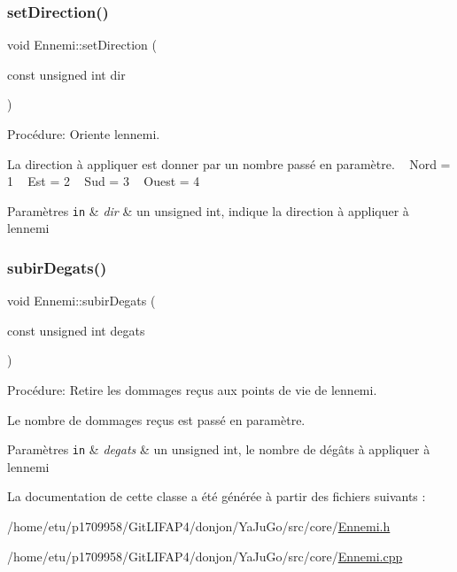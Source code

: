 \subsubsection{\texorpdfstring{set\+Direction()}{setDirection()}}
{\footnotesize\ttfamily void Ennemi\+::set\+Direction (\begin{DoxyParamCaption}\item[{const unsigned int}]{dir }\end{DoxyParamCaption})}



Procédure\+: Oriente l\textquotesingle{}ennemi. 

La direction à appliquer est donner par un nombre passé en paramètre. ~\newline
Nord = 1 ~\newline
Est = 2 ~\newline
Sud = 3 ~\newline
Ouest = 4 ~\newline

\begin{DoxyParams}[1]{Paramètres}
\mbox{\tt in}  & {\em dir} & un unsigned int, indique la direction à appliquer à l\textquotesingle{}ennemi \\
\hline
\end{DoxyParams}
\mbox{\label{classEnnemi_a44b78c61a2488e440387460470a67fd0}} 
\subsubsection{\texorpdfstring{subir\+Degats()}{subirDegats()}}
{\footnotesize\ttfamily void Ennemi\+::subir\+Degats (\begin{DoxyParamCaption}\item[{const unsigned int}]{degats }\end{DoxyParamCaption})}



Procédure\+: Retire les dommages reçus aux points de vie de l\textquotesingle{}ennemi. 

Le nombre de dommages reçus est passé en paramètre. 
\begin{DoxyParams}[1]{Paramètres}
\mbox{\tt in}  & {\em degats} & un unsigned int, le nombre de dégâts à appliquer à l\textquotesingle{}ennemi \\
\hline
\end{DoxyParams}


La documentation de cette classe a été générée à partir des fichiers suivants \+:\begin{DoxyCompactItemize}
\item 
/home/etu/p1709958/\+Git\+L\+I\+F\+A\+P4/donjon/\+Ya\+Ju\+Go/src/core/\mbox{\hyperlink{Ennemi_8h}{Ennemi.\+h}}\item 
/home/etu/p1709958/\+Git\+L\+I\+F\+A\+P4/donjon/\+Ya\+Ju\+Go/src/core/\mbox{\hyperlink{Ennemi_8cpp}{Ennemi.\+cpp}}\end{DoxyCompactItemize}

